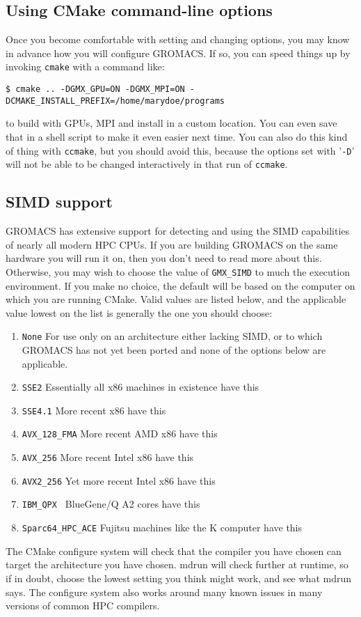 \documentclass{article}[12pt,a4paper,twoside]
\newcommand{\gromacs}{GROMACS}
\newcommand{\cmake}{CMake}
\begin{document}
\subsection{Using CMake command-line options}
Once you become comfortable with setting and changing options, you
may know in advance how you will configure \gromacs{}. If so, you can
speed things up by invoking \verb+cmake+ with a command like:
\begin{verbatim}
$ cmake .. -DGMX_GPU=ON -DGMX_MPI=ON -DCMAKE_INSTALL_PREFIX=/home/marydoe/programs
\end{verbatim}
to build with GPUs, MPI and install in a custom location. You can even
save that in a shell script to make it even easier next time. You can
also do this kind of thing with \verb+ccmake+, but you should avoid
this, because the options set with '\verb+-D+' will not be able to be
changed interactively in that run of \verb+ccmake+.

\subsection{SIMD support}
\gromacs{} has extensive support for detecting and using the SIMD
capabilities of nearly all modern HPC CPUs. If you are building
\gromacs{} on the same hardware you will run it on, then you don't
need to read more about this. Otherwise, you may wish to choose the
value of \verb+GMX_SIMD+ to much the execution environment. If you
make no choice, the default will be based on the computer on which you
are running \cmake{}. Valid values are listed below, and the
applicable value lowest on the list is generally the one you should
choose:
\begin{enumerate}
\item \verb+None+ For use only on an architecture either lacking SIMD,
  or to which \gromacs{} has not yet been ported and none of the
  options below are applicable.
\item \verb+SSE2+ Essentially all x86 machines in existence have this
\item \verb+SSE4.1+ More recent x86 have this
\item \verb+AVX_128_FMA+ More recent AMD x86 have this
\item \verb+AVX_256+ More recent Intel x86 have this
\item \verb+AVX2_256+ Yet more recent Intel x86 have this
\item \verb+IBM_QPX + BlueGene/Q A2 cores have this
\item \verb+Sparc64_HPC_ACE+ Fujitsu machines like the K computer have this
\end{enumerate}
The \cmake{} configure system will check that the compiler you have
chosen can target the architecture you have chosen. mdrun will check
further at runtime, so if in doubt, choose the lowest setting you
think might work, and see what mdrun says. The configure system also
works around many known issues in many versions of common HPC
compilers.
\end{document}
